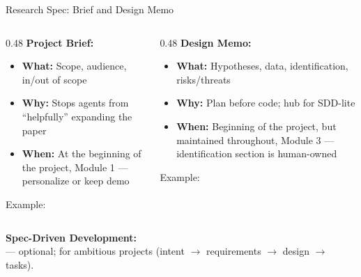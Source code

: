 \begin{frame}{Research Spec: Brief and Design Memo}
  \begin{columns}[T,onlytextwidth]
    \begin{column}{0.48\textwidth}
      \textbf{Project Brief: \\ }
      \begin{itemize}
        \item \textbf{What:} \textnormal{Scope, audience, in/out of scope}
        \item \textbf{Why:} \textnormal{Stops agents from ``helpfully'' expanding the paper}
        \item \textbf{When:} \textnormal{At the beginning of the project, Module 1 --- personalize or keep demo}
      \end{itemize}
      {\scriptsize Example: }
    \end{column}
    \begin{column}{0.48\textwidth}
      \textbf{Design Memo: \\ }
      \begin{itemize}
        \item \textbf{What:} \textnormal{Hypotheses, data, identification, risks/threats}
        \item \textbf{Why:} \textnormal{Plan before code; hub for SDD-lite}
        \item \textbf{When:} \textnormal{Beginning of the project, but maintained throughout, Module 3 --- identification section is human-owned}
      \end{itemize}
      {\scriptsize Example: }
    \end{column}
  \end{columns}
  \vspace{1.35em}
  \textbf{Spec-Driven Development: \\ } \textnormal{--- optional; for ambitious projects (intent $\to$ requirements $\to$ design $\to$ tasks).}
\end{frame}

